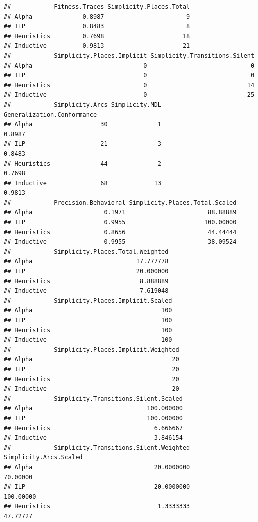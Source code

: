 \documentclass[]{article}
\begin{document}
\begin{verbatim}
##            Fitness.Traces Simplicity.Places.Total
## Alpha              0.8987                       9
## ILP                0.8483                       8
## Heuristics         0.7698                      18
## Inductive          0.9813                      21
##            Simplicity.Places.Implicit Simplicity.Transitions.Silent
## Alpha                               0                             0
## ILP                                 0                             0
## Heuristics                          0                            14
## Inductive                           0                            25
##            Simplicity.Arcs Simplicity.MDL Generalization.Conformance
## Alpha                   30              1                     0.8987
## ILP                     21              3                     0.8483
## Heuristics              44              2                     0.7698
## Inductive               68             13                     0.9813
##            Precision.Behavioral Simplicity.Places.Total.Scaled
## Alpha                    0.1971                       88.88889
## ILP                      0.9955                      100.00000
## Heuristics               0.8656                       44.44444
## Inductive                0.9955                       38.09524
##            Simplicity.Places.Total.Weighted
## Alpha                             17.777778
## ILP                               20.000000
## Heuristics                         8.888889
## Inductive                          7.619048
##            Simplicity.Places.Implicit.Scaled
## Alpha                                    100
## ILP                                      100
## Heuristics                               100
## Inductive                                100
##            Simplicity.Places.Implicit.Weighted
## Alpha                                       20
## ILP                                         20
## Heuristics                                  20
## Inductive                                   20
##            Simplicity.Transitions.Silent.Scaled
## Alpha                                100.000000
## ILP                                  100.000000
## Heuristics                             6.666667
## Inductive                              3.846154
##            Simplicity.Transitions.Silent.Weighted Simplicity.Arcs.Scaled
## Alpha                                  20.0000000               70.00000
## ILP                                    20.0000000              100.00000
## Heuristics                              1.3333333               47.72727

\end{verbatim}
\end{document}
